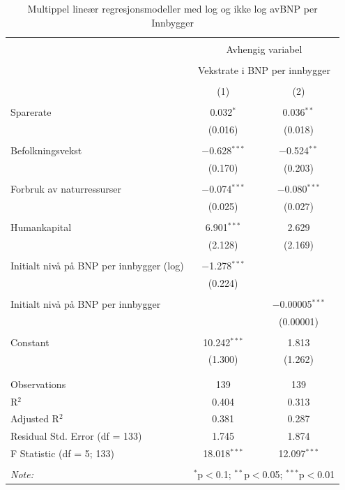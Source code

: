 \documentclass[
  12pt,
  a4paper,
  DIV=11,
  numbers=noendperiod]{scrartcl}
\begin{document}
\begin{table}[!htbp] \centering 
  \caption{Multippel lineær regresjonsmodeller med log og ikke log avBNP per Innbygger} 
  \label{tab:table2} 
\begin{tabular}{@{\extracolsep{5pt}}lcc} 
\\[-1.8ex]\hline 
\hline \\[-1.8ex] 
 & \multicolumn{2}{c}{Avhengig variabel} \\ 
\cline{2-3} 
\\[-1.8ex] & \multicolumn{2}{c}{Vekstrate i BNP per innbygger} \\ 
\\[-1.8ex] & (1) & (2)\\ 
\hline \\[-1.8ex] 
 Sparerate & 0.032$^{*}$ & 0.036$^{**}$ \\ 
  & (0.016) & (0.018) \\ 
  & & \\ 
 Befolkningsvekst & $-$0.628$^{***}$ & $-$0.524$^{**}$ \\ 
  & (0.170) & (0.203) \\ 
  & & \\ 
 Forbruk av naturressurser & $-$0.074$^{***}$ & $-$0.080$^{***}$ \\ 
  & (0.025) & (0.027) \\ 
  & & \\ 
 Humankapital & 6.901$^{***}$ & 2.629 \\ 
  & (2.128) & (2.169) \\ 
  & & \\ 
 Initialt nivå på BNP per innbygger (log) & $-$1.278$^{***}$ &  \\ 
  & (0.224) &  \\ 
  & & \\ 
 Initialt nivå på BNP per innbygger &  & $-$0.00005$^{***}$ \\ 
  &  & (0.00001) \\ 
  & & \\ 
 Constant & 10.242$^{***}$ & 1.813 \\ 
  & (1.300) & (1.262) \\ 
  & & \\ 
\hline \\[-1.8ex] 
Observations & 139 & 139 \\ 
R$^{2}$ & 0.404 & 0.313 \\ 
Adjusted R$^{2}$ & 0.381 & 0.287 \\ 
Residual Std. Error (df = 133) & 1.745 & 1.874 \\ 
F Statistic (df = 5; 133) & 18.018$^{***}$ & 12.097$^{***}$ \\ 
\hline 
\hline \\[-1.8ex] 
\textit{Note:}  & \multicolumn{2}{r}{$^{*}$p$<$0.1; $^{**}$p$<$0.05; $^{***}$p$<$0.01} \\ 
\end{tabular} 
\end{table}
\end{document}
